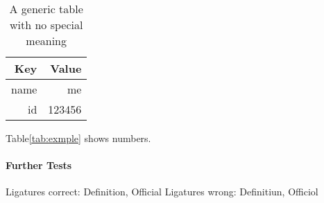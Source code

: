 \documentclass{scrartcl}
\begin{document}
\begin{table}
	\centering
    \begin{tabular}{@{}rr@{}} 
    \textbf{Key}  & \textbf{Value} \\ \hline
    name & me \\
    id & 123456\\
    \end{tabular}
    \caption{A generic table with no special meaning}
    \label{tab:example}
\end{table}



Table\ref{tab:exmple} shows numbers.



\paragraph{Further Tests}
Ligatures correct: Deﬁnition, Oﬀicial
Ligatures wrong: Deﬁnitiun, Oﬀiciol
\end{document}

